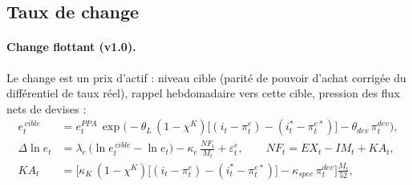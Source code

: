 \documentclass[11pt,a4paper]{article}
\begin{document}
\subsection{Taux de change}
\label{sec:change}
\paragraph{Change flottant (v1.0).} Le change est un prix d'actif : niveau cible (parité de pouvoir d'achat corrigée du différentiel de taux réel), rappel hebdomadaire vers cette cible, pression des flux nets de devises :
\begin{equation}
\begin{split}
e^{\,cible}_t &= e^{PPA}_t\,\exp\!\Big(-\theta_L\,(1-\chi^K)\big[(i_t-\pi^e_t) - (i^\ast_t-\pi^{e\ast}_t)\big] - \theta_{dev}\,\pi^{dev}_t\Big),\\
\Delta\ln e_t &= \lambda_e\,\big(\ln e^{\,cible}_t - \ln e_t\big) - \kappa_e\,\frac{NF_t}{M_t} + \varepsilon^e_t, \qquad NF_t = EX_t - IM_t + KA_t,\\
KA_t &= \Big[\kappa_K\,(1-\chi^K)\big[(i_t-\pi^e_t) - (i^\ast_t-\pi^{e\ast}_t)\big] - \kappa_{spec}\,\pi^{dev}_t\Big]\frac{M_t}{52},
\end{split}
\label{eq:fx}
\end{equation}
\end{document}
